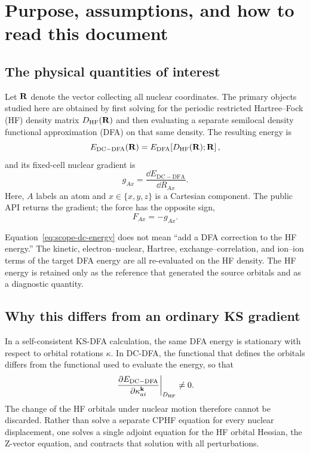 \section{Purpose, assumptions, and how to read this document}
\label{sec:scope}

\subsection{The physical quantities of interest}

Let $\mathbf{R}$ denote the vector collecting all nuclear coordinates.  The primary
objects studied here are obtained by first solving for the periodic restricted
Hartree--Fock (HF) density matrix $D_{\mathrm{HF}}(\mathbf{R})$ and then evaluating a
separate semilocal density functional approximation (DFA) on that same
density.  The resulting energy is
\begin{equation}
  E_{\mathrm{DC-DFA}}(\mathbf{R})
  = E_{\mathrm{DFA}}\!\left[D_{\mathrm{HF}}(\mathbf{R});\mathbf{R}\right],
  \label{eq:scope-dc-energy}
\end{equation}
and its fixed-cell nuclear gradient is
\begin{equation}
  g_{Ax}
  = \frac{\dd E_{\mathrm{DC-DFA}}}{\dd R_{Ax}}.
  \label{eq:scope-gradient}
\end{equation}
Here, $A$ labels an atom and $x\in\{x,y,z\}$ is a Cartesian component.  The
public API returns the gradient; the force has the opposite sign,
\begin{equation}
  F_{Ax}=-g_{Ax}.
  \label{eq:scope-force-sign}
\end{equation}

Equation~\eqref{eq:scope-dc-energy} does not mean ``add a DFA correction to the
HF energy.''  The kinetic, electron--nuclear, Hartree, exchange--correlation,
and ion--ion terms of the target DFA energy are all re-evaluated on the HF
density.  The HF energy is retained only as the reference that generated the
source orbitals and as a diagnostic quantity.

\subsection{Why this differs from an ordinary KS gradient}

In a self-consistent KS-DFA calculation, the same DFA energy is stationary with
respect to orbital rotations $\kappa$.  In DC-DFA, the functional that defines
the orbitals differs from the functional used to evaluate the energy, so that
\begin{equation}
  \left.
  \frac{\partial E_{\mathrm{DC-DFA}}}{\partial\kappa_{ai}^{\mathbf{k}}}
  \right|_{D_{\mathrm{HF}}}
  \ne 0.
  \label{eq:scope-nonstationary}
\end{equation}
The change of the HF orbitals under nuclear motion therefore cannot be
discarded.  Rather than solve a separate CPHF equation for every nuclear
displacement, one solves a single adjoint equation for the HF orbital Hessian,
the Z-vector equation, and contracts that solution with all perturbations.

